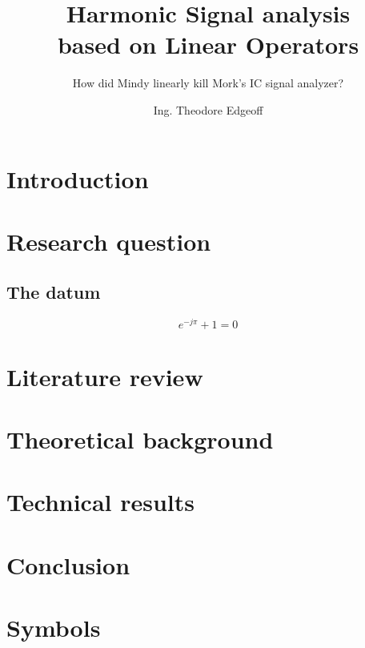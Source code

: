 \documentclass[b5paper,10pt,twoside,openright,filled]{uantwerpenphdthesis}
\title{Harmonic Signal analysis\\based on Linear Operators}
\subtitle{How did Mindy linearly kill Mork's IC signal analyzer?}
\author{Ing. Theodore Edgeoff}
\affiliation{University of Antwerp\\
  Faculty of Applied Engineering\\
  CoSys-Lab}
\begin{document}
\maketitle

\frontmatter

\tableofcontents

\mainmatter
\chapter*{Introduction}

\lipsum[1]

\chapter{Research question}

\section{The datum}

\lipsum[2]

\begin{equation}
  e^{-j\pi} + 1 = 0
\end{equation}

\lipsum[3-17]

\chapter{Literature review}

\lipsum[18-19]

\chapter{Theoretical background}

\lipsum[20-21]

\chapter{Technical results}

\lipsum[22-24]

\chapter{Conclusion}

\lipsum[25]

\appendix

\chapter{Symbols}


\makefinalpage
\end{document}
